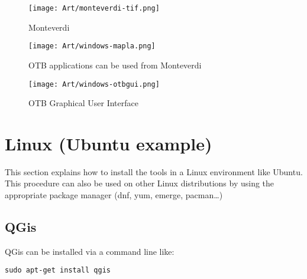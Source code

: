\documentclass[10pt,a4paper]{article}
\begin{document}
\begin{figure}[h]
  \center
  \texttt{[image: Art/monteverdi-tif.png]}
  \caption[]{Monteverdi}
  \label{fig:monteverdi}
\end{figure}

\begin{figure}[h]
  \center
  \texttt{[image: Art/windows-mapla.png]}
  \caption[]{OTB applications can be used from Monteverdi}
  \label{fig:windows-mapla}
\end{figure}

\begin{figure}[h]
  \center
  \texttt{[image: Art/windows-otbgui.png]}
  \caption[]{OTB Graphical User Interface}
  \label{fig:windows-otbgui}
\end{figure}

\begin{comment}
\subsection{OTB depuis QGIS}

Les applications OTB sont disponibles depuis QGIS. Pour cela

Attention ! QGIS est livré avec ses propres binaires OTB. Les applications ainsi
ouvertes depuis QGIS sont souvent différentes de celles installée ci-dessus, car
il s'agit typiquement d'une version plus ancienne.
Éventuellement, il est possible de remplacer l'OTB livrée avec QGIS en supprimant
ou écrasant les fichiers dans \texttt{}.

\begin{figure}[h]
  \center
  \texttt{[image: Art/qgis-otb.png]}
  \caption[]{Intégration QGIS - OTB}
  \label{fig:otb-qgis}
\end{figure}
\end{comment}

\clearpage
\section{Linux (Ubuntu example)}

This section explains how to install the tools in a Linux environment like Ubuntu. This procedure can also be used on other Linux distributions by using the appropriate package manager (dnf, yum,
emerge, pacman\ldots)

\subsection{QGis}
QGis can be installed via a command line like:
\begin{verbatim}
sudo apt-get install qgis
\end{verbatim}
\end{document}
